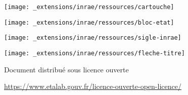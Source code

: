 \makeatletter
\let\inserttitle\@title
\makeatother
\makeatletter
\let\insertauthor\@author
\makeatother
\makeatletter
\let\insertdate\@date
\makeatother


\vspace*{-4.5cm}

%

\vspace*{12.15cm}

\hspace{-2.7cm}
\texttt{[image: \_extensions/inrae/ressources/cartouche]}\par

\hspace{12cm}
\texttt{[image: \_extensions/inrae/ressources/bloc-etat]}\par
\vspace*{-2cm}

\hspace{-2.8cm}
\texttt{[image: \_extensions/inrae/ressources/sigle-inrae]}

\vspace*{1cm}

\hspace{-1cm}
\setlength{\parindent}{0cm}
\texttt{[image: \_extensions/inrae/ressources/fleche-titre]}\hspace{0.3cm}\textcolor{inrae}{\sffamily\Huge\bfseries \inserttitle}\par\bigskip

\hspace{-1cm}\textcolor{inrae}{\sffamily \insertdate}\par

\hspace{-1cm}\textcolor{inraefonce}{\sffamily \insertauthor}\par

\vspace*{0.25cm}

\hspace{-1.3cm}
\textcolor{inraefonce}{\sffamily
Document distribué sous licence ouverte}\par
\vspace*{-0.3cm}
\hspace{-1.1cm} \href{https://www.etalab.gouv.fr/licence-ouverte-open-licence/}{https://www.etalab.gouv.fr/licence-ouverte-open-licence/}

\restoregeometry

